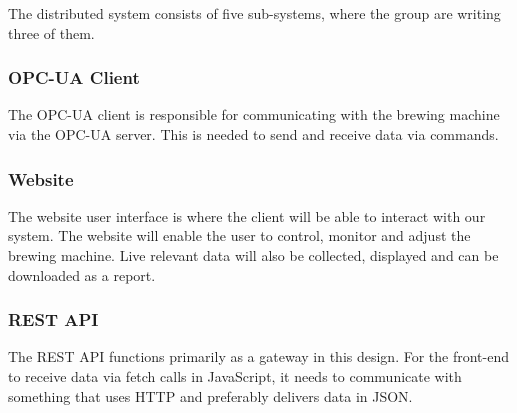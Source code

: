 The distributed system consists of five sub-systems, where the group are writing three
of them.

\subsubsection{OPC-UA Client}
The OPC-UA client is responsible for communicating with the brewing machine via
the OPC-UA server. This is needed to send and receive data via
commands.

\subsubsection{Website}
The website user interface is where the client will be able to interact with
our system. The website will enable the user to control, monitor and adjust
the brewing machine. Live relevant data will also be collected, displayed and
can be downloaded as a report.


\subsubsection{REST API}
The REST API functions primarily as a gateway in this design. For the
front-end to receive data via fetch calls in JavaScript, it needs to communicate 
with something that uses HTTP and preferably delivers data in JSON.

